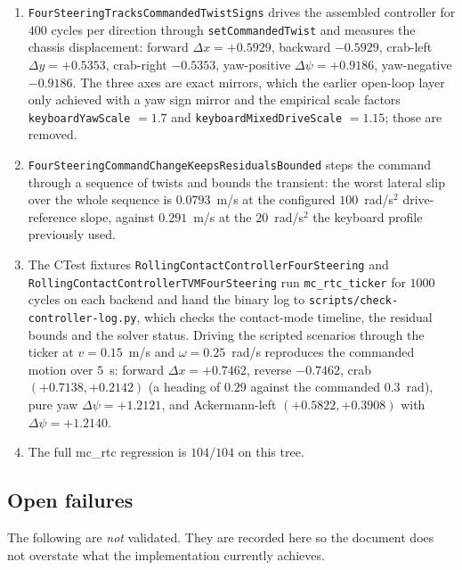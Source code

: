 \documentclass[10pt]{article}
\begin{document}
\begin{enumerate}

\item \texttt{FourSteeringTracksCommandedTwistSigns} drives the assembled
  controller for $400$ cycles per direction through \texttt{setCommandedTwist}
  and measures the chassis displacement: forward $\Delta x = +0.5929$, backward
  $-0.5929$, crab-left $\Delta y = +0.5353$, crab-right $-0.5353$, yaw-positive
  $\Delta\psi = +0.9186$, yaw-negative $-0.9186$. The three axes are exact
  mirrors, which the earlier open-loop layer only achieved with a yaw sign
  mirror and the empirical scale factors \texttt{keyboardYawScale} $=1.7$ and
  \texttt{keyboardMixedDriveScale} $=1.15$; those are removed.

\item \texttt{FourSteeringCommandChangeKeepsResidualsBounded} steps the command
  through a sequence of twists and bounds the transient: the worst lateral slip
  over the whole sequence is $0.0793$~m/s at the configured $100$~rad/s$^2$
  drive-reference slope, against $0.291$~m/s at the $20$~rad/s$^2$ the keyboard
  profile previously used.

\item The CTest fixtures \texttt{RollingContactControllerFourSteering} and
  \texttt{RollingContactControllerTVMFourSteering} run \texttt{mc\_rtc\_ticker}
  for $1000$ cycles on each backend and hand the binary log to
  \texttt{scripts/check-controller-log.py}, which checks the contact-mode
  timeline, the residual bounds and the solver status. Driving the scripted
  scenarios through the ticker at $v = 0.15$~m/s and
  $\omega = 0.25$~rad/s reproduces the commanded motion over $5$~s: forward
  $\Delta x = +0.7462$, reverse $-0.7462$, crab $(+0.7138, +0.2142)$ (a heading
  of $0.29$ against the commanded $0.3$~rad), pure yaw $\Delta\psi = +1.2121$,
  and Ackermann-left $(+0.5822, +0.3908)$ with $\Delta\psi = +1.2140$.

\item The full mc\_rtc regression is $104/104$ on this tree.

\end{enumerate}

\subsection{Open failures}
\label{sec:validation-open}

The following are \emph{not} validated. They are recorded here so the document
does not overstate what the implementation currently achieves.
\end{document}
